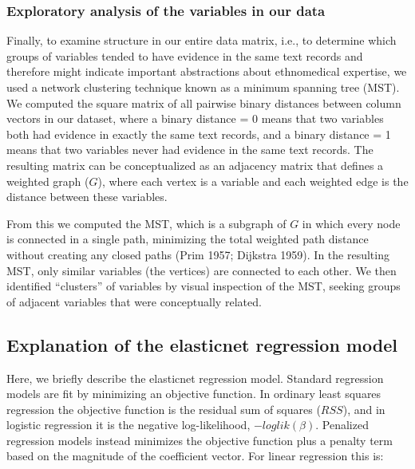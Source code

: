 \documentclass[
]{article}
\begin{document}
\hypertarget{exploratory-analysis-of-the-variables-in-our-data}{%
\subsubsection{Exploratory analysis of the variables in our data}\label{exploratory-analysis-of-the-variables-in-our-data}}

Finally, to examine structure in our entire data matrix, i.e., to determine which groups of variables tended to have evidence in the same text records and therefore might indicate important abstractions about ethnomedical expertise, we used a network clustering technique known as a minimum spanning tree (MST). We computed the square matrix of all pairwise binary distances between column vectors in our dataset, where a binary distance = 0 means that two variables both had evidence in exactly the same text records, and a binary distance = 1 means that two variables never had evidence in the same text records. The resulting matrix can be conceptualized as an adjacency matrix that defines a weighted graph (\(G\)), where each vertex is a variable and each weighted edge is the distance between these variables.

From this we computed the MST, which is a subgraph of \(G\) in which every node is connected in a single path, minimizing the total weighted path distance without creating any closed paths (Prim 1957; Dijkstra 1959). In the resulting MST, only similar variables (the vertices) are connected to each other. We then identified ``clusters'' of variables by visual inspection of the MST, seeking groups of adjacent variables that were conceptually related.

\hypertarget{explanation-of-the-elasticnet-regression-model}{%
\subsection{Explanation of the elasticnet regression model}\label{explanation-of-the-elasticnet-regression-model}}

Here, we briefly describe the elasticnet regression model. Standard regression models are fit by minimizing an objective function. In ordinary least squares regression the objective function is the residual sum of squares (\(RSS\)), and in logistic regression it is the negative log-likelihood, \(-loglik(\beta)\). Penalized regression models instead minimizes the objective function plus a penalty term based on the magnitude of the coefficient vector. For linear regression this is:
\end{document}
